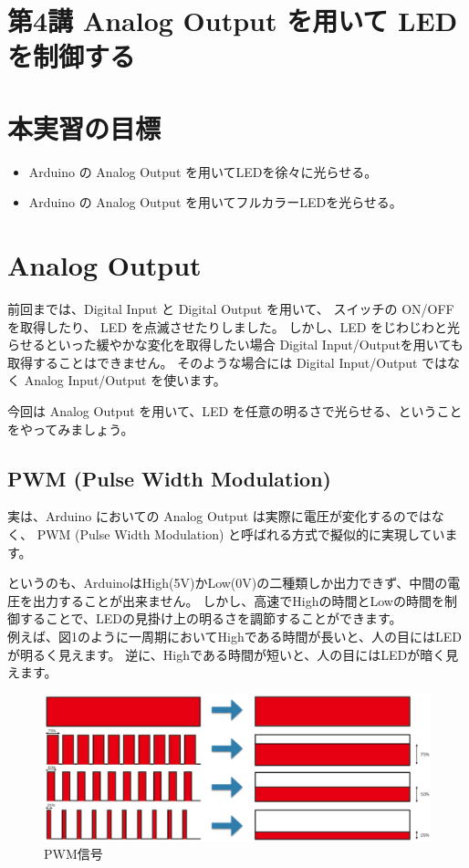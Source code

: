 \documentclass[11pt,a4paper]{jarticle}
\begin{document}
\section*{\LARGE{第4講 Analog Output を用いて LED を制御する}}
\section{本実習の目標}
\begin{itemize}
 \item Arduino の Analog Output を用いてLEDを徐々に光らせる。
 \item Arduino の Analog Output を用いてフルカラーLEDを光らせる。
\end{itemize}

\section{Analog Output}
前回までは、Digital Input と Digital Output を用いて、
スイッチの ON/OFF を取得したり、 LED を点滅させたりしました。
しかし、LED をじわじわと光らせるといった緩やかな変化を取得したい場合
Digital Input/Outputを用いても取得することはできません。
そのような場合には Digital Input/Output ではなく Analog Input/Output を使います。

今回は Analog Output を用いて、LED を任意の明るさで光らせる、ということをやってみましょう。

\subsection*{PWM (Pulse Width Modulation)}
実は、Arduino においての Analog Output は実際に電圧が変化するのではなく、
PWM (Pulse Width Modulation) と呼ばれる方式で擬似的に実現しています。

というのも、ArduinoはHigh(5V)かLow(0V)の二種類しか出力できず、中間の電圧を出力することが出来ません。
しかし、高速でHighの時間とLowの時間を制御することで、LEDの見掛け上の明るさを調節することができます。
\\

例えば、図1のように一周期においてHighである時間が長いと、人の目にはLEDが明るく見えます。
逆に、Highである時間が短いと、人の目にはLEDが暗く見えます。

\begin{figure}[htbp]
  \centering
  \includegraphics[width=0.95\columnwidth]{img/PWM.eps}
 \caption{PWM信号}
  \label{figure:LED}
\end{figure}
\end{document}
